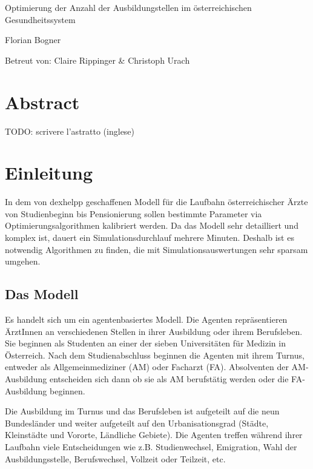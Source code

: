 \documentclass[a4paper,12pt]{article}
\begin{document}
\begin{titlepage}
\huge
\centering
Optimierung der Anzahl der Ausbildungstellen im österreichischen Gesundheitssystem 

\vfill

\normalsize
Florian Bogner

Betreut von: Claire Rippinger \& Christoph Urach
\end{titlepage}




\tableofcontents
\newpage

\section{Abstract}

TODO: scrivere l'astratto (inglese)

\section{Einleitung}

In dem von dexhelpp geschaffenen Modell für die Laufbahn österreichischer Ärzte von Studienbeginn bis Pensionierung sollen bestimmte Parameter via Optimierungsalgorithmen kalibriert werden. Da das Modell sehr detailliert und komplex ist, dauert ein Simulationsdurchlauf mehrere Minuten. Deshalb ist es notwendig Algorithmen zu finden, die mit Simulationsauswertungen sehr sparsam umgehen. 

\subsection{Das Modell}

Es handelt sich um ein agentenbasiertes Modell. Die Agenten repräsentieren ÄrztInnen an verschiedenen Stellen in ihrer Ausbildung oder ihrem Berufsleben. Sie beginnen als Studenten an einer der sieben Universitäten für Medizin in Österreich. Nach dem Studienabschluss beginnen die Agenten mit ihrem Turnus, entweder als Allgemeinmediziner (AM) oder Facharzt (FA). Absolventen der AM-Ausbildung entscheiden sich dann ob sie als AM berufstätig werden oder die FA-Ausbildung beginnen. 

Die Ausbildung im Turnus und das Berufsleben ist aufgeteilt auf die neun Bundesländer und weiter aufgeteilt auf den Urbanisationsgrad (Städte, Kleinstädte und Vororte, Ländliche Gebiete). Die Agenten treffen während ihrer Laufbahn viele Entscheidungen wie z.B. Studienwechsel, Emigration, Wahl der Ausbildungsstelle, Berufswechsel, Vollzeit oder Teilzeit, etc. 
\end{document}
